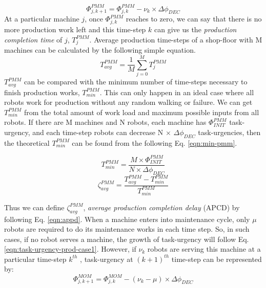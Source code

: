 \documentclass[smallcondensed]{svjour3}
\begin{document}
\begin{equation}
\Phi_{j, k+1}^{PMM} = \Phi_{j, k}^{PMM} - \nu_{k} \times \Delta \phi_{DEC}
\label{eqn:task-urgency-prod-case2}
\end{equation}
At a particular machine $j$, once $\Phi_{j, k}^{PMM}$ reaches to zero, we can say that there is no more production work left and this time-step $k$ can give us the {\em production completion time} of $j$, $T_{j}^{PMM}$. Average production time-steps of a shop-floor with M machines can be calculated by the following simple equation.
\begin{equation}
T_{avg}^{PMM} = \frac{1}{M} \sum_{j=0}^{M} T_{j}^{PMM} 
\label{eqn:avg-pmm}
\end{equation}
$T_{avg}^{PMM}$ can be compared with the minimum number of time-steps necessary to finish production works, $T_{min}^{PMM}$. This can only happen in an ideal case where all robots work for production without any random walking or failure. We can get $T_{min}^{PMM}$ from the total amount of work load and maximum possible inputs from all robots. If there are M machines and N robots, each machine has $\Phi_{INIT}^{PMM}$ task-urgency, and each time-step robots can decrease N $\times$ $\Delta \phi_{DEC}$ task-urgencies, then the theoretical $T_{min}^{PMM}$ can be found from the following Eq. \ref{eqn:min-pmm}.
%
\begin{multicols}{2}
\small
\begin{equation}
T_{min}^{PMM} = \frac{M \times \Phi_{INIT}^{PMM}}{N \times \Delta \phi_{DEC}} 
\label{eqn:min-pmm}
\end{equation}
\vspace*{0.2cm}
\begin{equation}
\zeta_{avg}^{PMM} = \frac{T_{avg}^{PMM} - T_{min}^{PMM}}{T_{min}^{PMM}} 
\label{eqn:appd}
\end{equation}
\end{multicols}
Thus we can define $\zeta_{avg}^{PMM}$, {\em average production completion delay} (APCD) by following Eq. \ref{eqn:appd}.
When a machine enters into maintenance cycle, only $\mu$ robots are required to do its maintenance works in each time step. So, in such cases, if no robot serves a machine, the growth of task-urgency will follow Eq. \ref{eqn:task-urgency-prod-case1}. However, if $\nu_{k}$ robots are serving this machine at a particular time-step $k^{th}$ , task-urgency at $(k+1)^{th}$ time-step can be represented by:
\begin{equation}
\Phi_{j, k+1}^{MOM} = \Phi_{j, k}^{MOM}- (\nu_{k} - \mu) \times \Delta \phi_{DEC}
\label{eqn:task-urgency-maint-case}
\end{equation}
\end{document}
